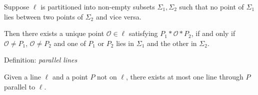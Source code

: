 \begin{minipage}[t]{0.48\linewidth}
\phantom{bob}\smallbreak

Suppose $\ell$ is partitioned into non-empty subsets $\Sigma_1,\Sigma_2$ such that no point of $\Sigma_1$ lies between two points of $\Sigma_2$ and vice versa.\par
Then there exists a unique point $\mathcal O\in\ell$ satisfying $P_1*\mathcal O*P_2$, if and only if $\mathcal O\neq P_1$, $\mathcal O\neq P_2$ and one of $P_1$ or $P_2$ lies in $\Sigma_1$ and the other in $\Sigma_2$.\medbreak



\phantom{bob}\smallbreak

Definition: \emph{parallel lines}\smallbreak

Given a line $\ell$ and a point $P$ not on $\ell$, there exists at most one line through $P$ parallel to $\ell$.
\end{minipage}


\clearpage



